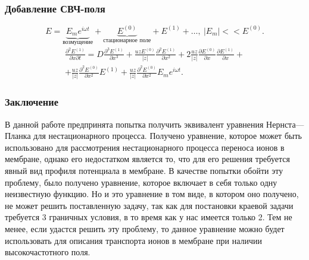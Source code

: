 \documentclass[10pt,pdf]{beamer}
\newcommand{\pder}[2] {\frac{\partial #1}{\partial #2}}
\newcommand{\ppder}[2]{\frac{\partial^2 #1}{\partial {#2}^2}}
\newcommand{\pcder}[3]{\frac{\partial^2 #1}{\partial #2 \partial #3}}
\newcommand{\abs}[1]{\left| #1 \right|}
\begin{document}
  \begin{frame}
    \frametitle{Добавление СВЧ-поля}
    \begin{equation}
        E = \underbrace{E_m e^{i\omega t}}_\text{возмущение} +
        \underbrace{E^{(0)}}_\text{стационарное поле} +
        E^{(1)} + \ldots,\ |E_m| << E^{(0)}.
    \end{equation}
    \begin{gather}
    \pcder{E^{(1)}}{x}{t} = D\frac{\partial^3 E^{(1)}}{\partial x^3} +
    \frac{uzE^{(0)}}{\abs{z}}\ppder{E^{(1)}}{x} +
    2\frac{uz}{\abs{z}}\pder{E^{(0)}}{x}\pder{E^{(1)}}{x} +\nonumber \\+
    \frac{uz}{\abs{z}}\ppder{E^{(0)}}{x} E^{(1)} +
    \frac{uz}{\abs{z}}\ppder{E^{(0)}}{x} E_m e^{i\omega t}.
\end{gather}
  \end{frame}
  \begin{frame}
      \frametitle{Заключение}
      В данной работе предпринята попытка получить эквивалент уравнения
Нернста—Планка для нестационарного процесса. Получено уравнение, которое может быть использовано для рассмотрения нестационарного
процесса переноса ионов в мембране, однако его недостатком является то,
что для его решения требуется явный вид профиля потенциала в мембране. В
качестве попытки обойти эту проблему, было получено уравнение,
которое включает в себя только одну неизвестную функцию. Но и это
уравнение в том виде, в котором оно получено, не может решить
поставленную задачу, так как для постановки краевой задачи требуется 3
граничных условия, в то время как у нас имеется только 2. Тем не менее,
если удастся решить эту проблему, то данное уравнение можно будет
использовать для описания транспорта ионов в мембране при наличии
высокочастотного поля.
  \end{frame}
\end{document}
